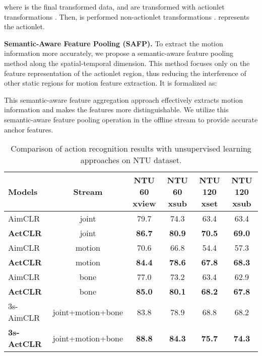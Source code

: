 \documentclass[twocolumn]{article}
\newcommand{\wh}[1]{\textcolor{black}{#1}}
\begin{document}
where  is the final transformed data,  and  are transformed with actionlet transformations . Then,  is performed non-actionlet transformations .  represents the actionlet.
\vspace{1mm}

\noindent\textbf{Semantic-Aware Feature Pooling (SAFP).} 
\label{sec:safp}
To extract the motion information more accurately, we propose \wh{a} semantic-aware feature pooling method along the spatial-temporal dimension. This method focuses only on the feature representation of the actionlet region, thus reducing the interference of other static regions for motion feature extraction. It is formalized as:



This semantic-aware feature aggregation approach effectively extracts motion information and makes the features more distinguishable. We utilize this semantic-aware feature pooling operation in the offline stream to provide accurate anchor features.



\begin{table*}[tb]
\small
\centering
\caption{Comparison of action recognition results with unsupervised learning approaches on NTU dataset.}
\begin{tabular}{l|c|c|c|c|c}
    \toprule
Models& Stream &NTU 60 xview&NTU 60 xsub&NTU 120 xset&NTU 120 xsub\\
    \midrule
    AimCLR~\cite{guo2021contrastive} & joint & 79.7 & 74.3 & 63.4 & 63.4\\
\textbf{ActCLR} & joint & \textbf{86.7} &\textbf{80.9}&\textbf{70.5} &\textbf{69.0}\\
    \midrule
    AimCLR~\cite{guo2021contrastive} & motion & 70.6 & 66.8 & 54.4 & 57.3\\
\textbf{ActCLR} & motion & \textbf{84.4} &\textbf{78.6}&\textbf{67.8} &\textbf{68.3}\\
    \midrule
    AimCLR~\cite{guo2021contrastive} & bone & 77.0 & 73.2 & 63.4& 62.9\\
\textbf{ActCLR} & bone & \textbf{85.0} &\textbf{80.1}&\textbf{68.2} &\textbf{67.8}\\
    \midrule
    3s-AimCLR~\cite{guo2021contrastive} & \quad joint+motion+bone \quad & 83.8 & 78.9 & 68.8 & 68.2\\
\textbf{3s-ActCLR} & \quad joint+motion+bone \quad & \textbf{88.8} &\textbf{84.3}&\textbf{75.7} &\textbf{74.3}\\
    \bottomrule
\end{tabular}
\label{tab:unsupervised_ntu}
\end{table*}
\end{document}
